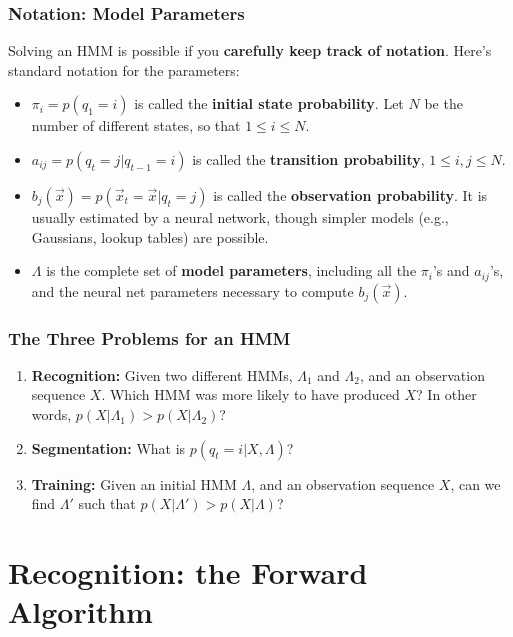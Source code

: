 \documentclass{beamer}
\begin{document}
\begin{frame}
  \frametitle{Notation: Model Parameters}

  Solving an HMM is possible if you {\bf carefully keep track of
  notation}.  Here's standard notation for the parameters:
  \begin{itemize}
  \item $\pi_i = p(q_1=i)$ is called the {\bf initial state probability}.
    Let $N$ be the number of different states, so that $1\le i\le N$.
  \item $a_{ij} = p(q_t=j|q_{t-1}=i)$ is called the {\bf transition
    probability}, $1\le i,j\le N$.
  \item $b_j(\vec{x}) = p(\vec{x}_t=\vec{x}|q_t=j)$ is called the
    {\bf observation probability}.  It is usually estimated by
    a neural network, though simpler models (e.g., Gaussians, lookup tables)
    are possible.
  \item $\Lambda$ is the complete set of {\bf model parameters},
    including all the $\pi_i$'s and $a_{ij}$'s, and the neural net
    parameters necessary to compute $b_j(\vec{x})$.
  \end{itemize}
\end{frame}

\begin{frame}
  \frametitle{The Three Problems for an HMM}

  \begin{enumerate}
  \item {\bf Recognition:} Given two different HMMs, $\Lambda_1$ and
    $\Lambda_2$, and an observation sequence $X$.  Which HMM was more
    likely to have produced $X$?  In other words, 
    $p(X|\Lambda_1)>p(X|\Lambda_2)$?
  \item {\bf Segmentation:} What is $p(q_t=i|X,\Lambda)$?
  \item {\bf Training:} Given an initial HMM $\Lambda$, and an
    observation sequence $X$, can we find $\Lambda'$ such that
    $p(X|\Lambda') > p(X|\Lambda)$?
  \end{enumerate}
\end{frame}

\section[Recognition]{Recognition: the Forward Algorithm}
\setcounter{subsection}{1}
\end{document}
